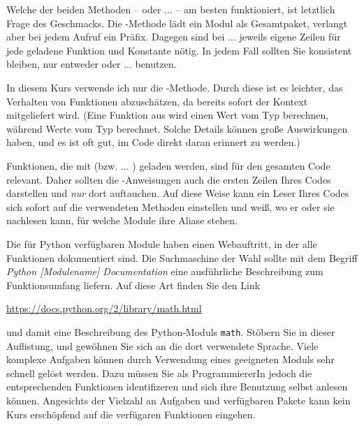 \begin{hintbox}
Welche der beiden Methoden --  oder  ...  -- am besten funktioniert, ist letztlich Frage des Geschmacks. Die -Methode lädt ein Modul als Gesamtpaket, verlangt aber bei jedem Aufruf ein Präfix. Dagegen sind bei  ...  jeweils eigene Zeilen für jede geladene Funktion und Konstante nötig. In jedem Fall sollten Sie konsistent bleiben, \ie nur entweder  oder  ...  benutzen.

In diesem Kurs verwende ich nur die -Methode. Durch diese ist es leichter, das Verhalten von Funktionen abzuschätzen, da bereits sofort der Kontext mitgeliefert wird. (Eine Funktion aus  wird \idR einen Wert vom Typ  berechnen, während  \idR Werte vom Typ  berechnet. Solche Details können große Auswirkungen haben, und es ist oft gut, im Code direkt daran erinnert zu werden.)
\end{hintbox}

\begin{hintbox}
Funktionen, die mit  (bzw.  ... ) geladen werden, sind \idR für den gesamten Code relevant. Daher sollten die -Anweisungen auch die ersten Zeilen Ihres Codes darstellen und \emph{nur} dort auftauchen. Auf diese Weise kann ein Leser Ihres Codes sich sofort auf  die verwendeten Methoden einstellen und weiß, wo er oder sie nachlesen kann, für welche Module ihre Aliase stehen.
\end{hintbox}

Die für Python verfügbaren Module haben \idR einen Webauftritt, in der alle Funktionen dokumentiert sind. Die Suchmaschine der Wahl sollte mit dem Begriff \emph{Python [Modulename] Documentation} eine ausführliche Beschreibung zum Funktionsumfang liefern. Auf diese Art finden Sie \ua den Link
\begin{center}
	\url{https://docs.python.org/2/library/math.html}
\end{center}
und damit eine Beschreibung des Python-Moduls \texttt{math}. Stöbern Sie in dieser Auflistung, und gewöhnen Sie sich an die dort verwendete Sprache. Viele komplexe Aufgaben können durch Verwendung eines geeigneten Moduls sehr schnell gelöst werden. Dazu müssen Sie als ProgrammiererIn jedoch die entsprechenden Funktionen identifizeren und sich ihre Benutzung selbst anlesen können. Angesichts der Vielzahl an Aufgaben und verfügbaren Pakete kann kein Kurs erschöpfend auf die verfügaren Funktionen eingehen.